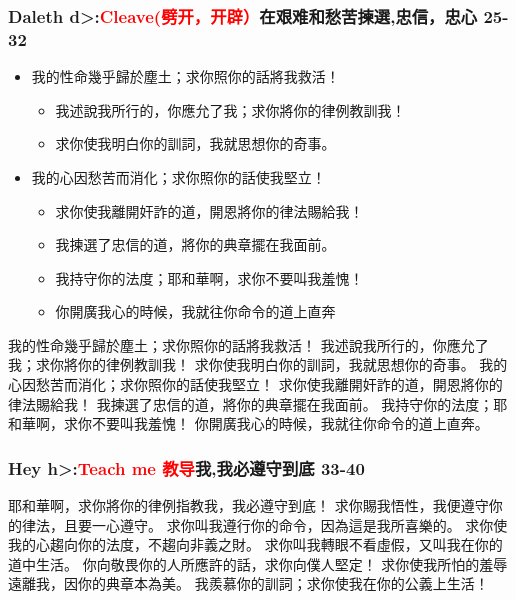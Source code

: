 \subsubsection{Daleth \<d>:\textcolor{red}{Cleave(劈开，开辟）}在艰难和愁苦揀選,忠信，忠心 25-32}
\begin{itemize}
\itemsep-.45em
\item 我的性命幾乎歸於塵土；求你照你的話將我救活！ 
\begin{itemize}
\itemsep-.45em
\item  我述說我所行的，你應允了我；求你將你的律例教訓我！ 
\item  求你使我明白你的訓詞，我就思想你的奇事。
\end{itemize}
\item  我的心因愁苦而消化；求你照你的話使我堅立！
\begin{itemize}
\itemsep-.45em 
\item  求你使我離開奸詐的道，開恩將你的律法賜給我！ 
\item  我揀選了忠信的道，將你的典章擺在我面前。 
\item  我持守你的法度；耶和華啊，求你不要叫我羞愧！ 
\item  你開廣我心的時候，我就往你命令的道上直奔
\end{itemize}
\end{itemize}
我的性命幾乎歸於塵土；求你照你的話將我救活！
我述說我所行的，你應允了我；求你將你的律例教訓我！
求你使我明白你的訓詞，我就思想你的奇事。
我的心因愁苦而消化；求你照你的話使我堅立！
求你使我離開奸詐的道，開恩將你的律法賜給我！
我揀選了忠信的道，將你的典章擺在我面前。
我持守你的法度；耶和華啊，求你不要叫我羞愧！
你開廣我心的時候，我就往你命令的道上直奔。



\subsubsection{Hey \<h>:\textcolor{red}{Teach me 教导}我,我必遵守到底 33-40}
耶和華啊，求你將你的律例指教我，我必遵守到底！
求你賜我悟性，我便遵守你的律法，且要一心遵守。
求你叫我遵行你的命令，因為這是我所喜樂的。
求你使我的心趨向你的法度，不趨向非義之財。
求你叫我轉眼不看虛假，又叫我在你的道中生活。
你向敬畏你的人所應許的話，求你向僕人堅定！
求你使我所怕的羞辱遠離我，因你的典章本為美。
我羨慕你的訓詞；求你使我在你的公義上生活！




